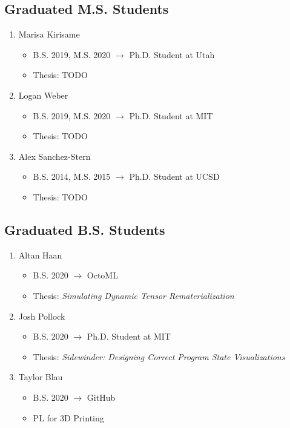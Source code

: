 \documentclass[10pt]{article}
\begin{document}
\subsection*{Graduated M.S. Students}

\begin{enumerate}[resume]
  \item Marisa Kirisame
    \begin{itemize}
      \item B.S. 2019, M.S. 2020 $\rightarrow$ Ph.D. Student at Utah
      \item Thesis: TODO
    \end{itemize}

  \item Logan Weber
    \begin{itemize}
      \item B.S. 2019, M.S. 2020 $\rightarrow$ Ph.D. Student at MIT
      \item Thesis: TODO
    \end{itemize}

  \item Alex Sanchez-Stern
    \begin{itemize}
      \item B.S. 2014, M.S. 2015 $\rightarrow$ Ph.D. Student at UCSD
      \item Thesis: TODO
    \end{itemize}
\end{enumerate}

\subsection*{Graduated B.S. Students}

\begin{enumerate}[resume]
  \item Altan Haan
    \begin{itemize}
      \item B.S. 2020 $\rightarrow$ OctoML
      \item Thesis: \textit{Simulating Dynamic Tensor Rematerialization}
    \end{itemize}

  \item Josh Pollock
    \begin{itemize}
      \item B.S. 2020 $\rightarrow$ Ph.D. Student at MIT
      \item Thesis: \textit{Sidewinder: Designing Correct Program State Visualizations}
    \end{itemize}

  \item Taylor Blau
    \begin{itemize}
      \item B.S. 2020 $\rightarrow$ GitHub
      \item PL for 3D Printing
    \end{itemize}
\end{enumerate}
\end{document}
